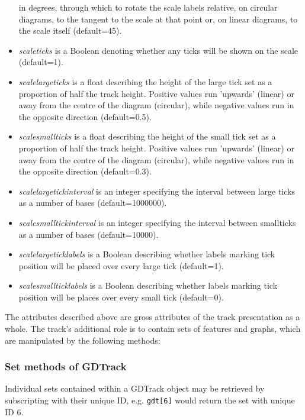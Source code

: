 \documentclass{article}
\begin{document}
\begin{itemize}
	in degrees, through which to rotate the scale labels relative, on 
	circular diagrams, to the tangent to the scale at that point or, on 
	linear diagrams, to the scale itself (default=45).
	\item \textit{scale\us ticks} is a Boolean denoting whether any ticks 
	will be shown on the scale (default=1).
	\item \textit{scale\us largeticks} is a float describing the height 
	of the large tick set as a proportion of half the track height.  
	Positive values run 'upwards' (linear) or away from the centre of the
	diagram (circular), while negative values run in the opposite 
	direction (default=0.5).
	\item \textit{scale\us smallticks} is a float describing the height 
	of the small tick set as a proportion of half the track height.  
	Positive values run 'upwards' (linear) or away from the centre of the
	diagram (circular), while negative values run in the opposite 
	direction (default=0.3).
	\item \textit{scale\us largetick\us interval} is an integer specifying 
	the interval between large ticks as a number of bases 
	(default=1000000).
	\item \textit{scale\us smalltick\us interval} is an integer specifying
	the interval between smallticks as a number of bases (default=10000).
	\item \textit{scale\us largetick\us labels} is a Boolean describing 
	whether labels marking tick position will be placed over every large 
	tick (default=1).
	\item \textit{scale\us smalltick\us labels} is a Boolean describing 
	whether labels marking tick position will be places over every small 
	tick (default=0).
\end{itemize}

The attributes described above are gross attributes of the track presentation 
as a whole.  The track's additional role is to contain sets of features and 
graphs, which are manipulated by the following methods:

\subsubsection{Set methods of GDTrack}
Individual sets contained within a GDTrack object may be retrieved by 
subscripting with their unique ID, e.g. \texttt{gdt[6]} would return the 
set with unique ID 6.
\end{document}
